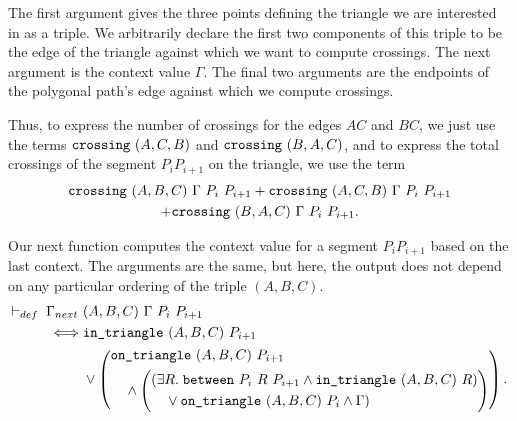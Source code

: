The first argument gives the three points defining the triangle we are interested in as a triple. We arbitrarily declare the first two components of this triple to be the edge of the triangle against which we want to compute crossings. The next argument is the context value $\Gamma$. The final two arguments are the endpoints of the polygonal path's edge against which we compute crossings.

Thus, to express the number of crossings for the edges $AC$ and $BC$, we just use the terms $\texttt{crossing}\ (A,C,B)$ and $\texttt{crossing}\ (B,A,C)$, and to express the total crossings of the segment $P_iP_{i+1}$ on the triangle, we use the term
\begin{multline*}
\texttt{crossing}\ (A,B,C)\ \Gamma\ P_i\ P_{i+1} + \texttt{crossing}\ (A,C,B)\ \Gamma\ P_i\ P_{i+1}\\ + \texttt{crossing}\ (B,A,C)\ \Gamma\ P_i\ P_{i+1}.
\end{multline*}

Our next function computes the context value for a segment $P_iP_{i+1}$ based on the last context. The arguments are the same, but here, the output does not depend on any particular ordering of the triple $(A,B,C)$.
\begin{equation*}
\begin{split}
\vdash_{def}\;\Gamma_{next}\ &(A,B,C)\ \Gamma\ P_i\ P_{i+1} \\
\iff &\texttt{in\_triangle}\ (A,B,C)\ P_{i+1}\\
& \vee \left(\begin{aligned}&\texttt{on\_triangle}\ (A,B,C)\ P_{i+1}\\
& \quad \wedge \left(\begin{aligned}&(\exists R.\; \texttt{between}\ P_i\ R\ P_{i+1} \wedge \texttt{in\_triangle}\ (A,B,C)\ R)\\
& \quad\vee \texttt{on\_triangle}\ (A,B,C)\ P_i \wedge \Gamma)\end{aligned}\right)\end{aligned}\right).
\end{split}
\end{equation*}

